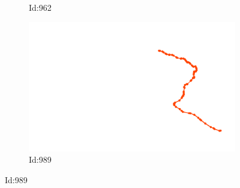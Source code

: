 \documentclass[12pt,twoside]{report}
\begin{document}
\begin{figure}
\begin{subfigure}[b]{0.20\textwidth}
\caption{Id:962}
\end{subfigure}
\begin{subfigure}[b]{0.20\textwidth}
\centering
\includegraphics[width=\textwidth]{../../trajectories/989.png}
\caption{Id:989}
\end{subfigure}
\end{figure}
\end{document}

